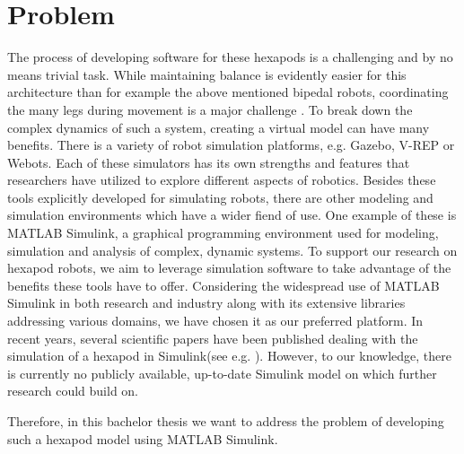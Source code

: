 \section{Problem}
The process of developing software for these hexapods is a challenging and by no means trivial task.
While maintaining balance is evidently easier for this architecture than for example the above mentioned bipedal robots, coordinating the many legs during movement is a major challenge \parencite{azayev2020blind,schilling2013walknet}.
To break down the complex dynamics of such a system, creating a virtual model can have many benefits.
There is a variety of robot simulation platforms, e.g. Gazebo, V-REP or Webots. 
Each of these simulators has its own strengths and features that researchers have utilized to explore different aspects of robotics.
Besides these tools explicitly developed for simulating robots, there are other modeling and simulation environments which have a wider fiend of use.
One example of these is MATLAB Simulink, a graphical programming environment used for modeling, simulation and analysis of complex, dynamic systems.
To support our research on hexapod robots, we aim to leverage simulation software to take advantage of the benefits these tools have to offer.
Considering the widespread use of MATLAB Simulink in both research and industry along with its extensive libraries addressing various domains, we have chosen it as our preferred platform.
In recent years, several scientific papers have been published dealing with the simulation of a hexapod in Simulink(see e.g. \cite{tanaka2019development, barai2013smart, atify2019propelling}).
However, to our knowledge, there is currently no publicly available, up-to-date Simulink model on which further research could build on.

Therefore, in this bachelor thesis we want to address the problem of developing such a hexapod model using MATLAB Simulink.


